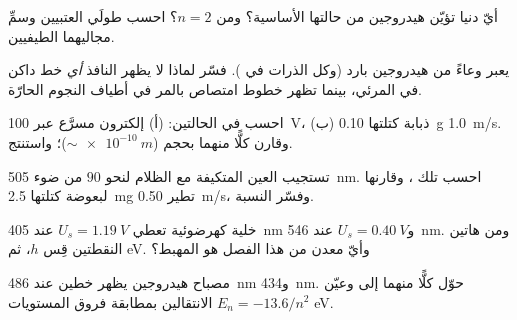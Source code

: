 \begin{exercise}[$\star\star$]\label{exo:g12:quantum-world:8}
أيّ   دنيا تؤيّن  هيدروجين من حالتها الأساسية؟ ومن
$n = 2$؟ احسب طولَي  العتبيين وسمِّ مجاليهما الطيفيين.
\end{exercise}

\begin{exercise}[$\star\star$]\label{exo:g12:quantum-world:9}
 يعبر وعاءً من هيدروجين بارد (وكل الذرات في ).
فسّر لماذا لا يظهر  النافذ \emph{أي} خط داكن في
المرئي، بينما تظهر خطوط امتصاص بالمر في أطياف النجوم الحارّة.
\end{exercise}

\begin{exercise}[$\star\star$]\label{exo:g12:quantum-world:10}
احسب  في الحالتين: (أ) إلكترون مسرَّع عبر
\qty{100}{V}، (ب) ذبابة كتلتها \qty{0.10}{g}  \qty{1.0}{m/s}. وقارن كلًّا منهما
بحجم  ($\sim \qty{e-10}{m}$)؛ واستنتج.
\end{exercise}

\begin{exercise}[$\star\star$]\label{exo:g12:quantum-world:11}
تستجيب العين المتكيفة مع الظلام لنحو $90$  من ضوء \qty{505}{nm}.
احسب تلك ، وقارنها  لبعوضة كتلتها \qty{2.5}{mg}
تطير  \qty{0.50}{m/s}، وفسّر النسبة.
\end{exercise}

\begin{exercise}[$\star\star\star$]\label{exo:g12:quantum-world:12}
خلية كهرضوئية تعطي $U_s = \qty{1.19}{V}$ عند \qty{405}{nm} و$U_s =
\qty{0.40}{V}$ عند \qty{546}{nm}. ومن هاتين النقطتين قِس $h$، ثم
  \unit{eV}. وأيّ معدن من هذا الفصل هو المهبط؟
\end{exercise}

\begin{exercise}[$\star\star\star$]\label{exo:g12:quantum-world:13}
مصباح هيدروجين يظهر خطين عند \qty{486}{nm} و\qty{434}{nm}. حوّل
كلًّا منهما إلى   وعيّن الانتقالين بمطابقة
فروق المستويات $E_n = -13.6/n^2$ \unit{eV}.
\end{exercise}

